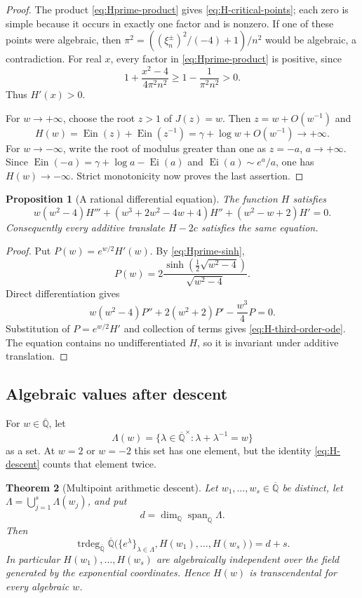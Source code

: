 \documentclass[11pt]{article}
\newtheorem{theorem}{Theorem}[section]
\newtheorem{proposition}[theorem]{Proposition}
\theoremstyle{definition}
\theoremstyle{remark}
\newcommand{\Q}{\mathbb Q}
\newcommand{\Qbar}{\overline{\mathbb Q}}
\newcommand{\Ein}{\operatorname{Ein}}
\newcommand{\Ei}{\operatorname{Ei}}
\newcommand{\Span}{\operatorname{span}}
\begin{document}
\begin{proof}
The product \eqref{eq:Hprime-product} gives
\eqref{eq:H-critical-points}; each zero is simple because it occurs in
exactly one factor and is nonzero.  If one of these points were algebraic,
then $\pi^2=((\xi_n^\pm)^2/(-4)+1)/n^2$ would be algebraic, a contradiction.
For real $x$, every factor in \eqref{eq:Hprime-product} is positive, since
\[
 1+\frac{x^2-4}{4\pi^2n^2}
 \geq1-\frac1{\pi^2n^2}>0.
\]
Thus $H'(x)>0$.

For $w\to+\infty$, choose the root $z>1$ of $J(z)=w$.  Then
$z=w+O(w^{-1})$ and
\[
 H(w)=\Ein(z)+\Ein(z^{-1})
     =\gamma+\log w+O(w^{-1})\longrightarrow+\infty.
\]
For $w\to-\infty$, write the root of modulus greater than one as $z=-a$,
$a\to+\infty$.  Since
$\Ein(-a)=\gamma+\log a-\Ei(a)$ and
$\Ei(a)\sim e^a/a$, one has $H(w)\to-\infty$.  Strict monotonicity now
proves the last assertion.
\end{proof}

\begin{proposition}[A rational differential equation]
\label{prop:H-ode}
The function $H$ satisfies
\begin{equation}\label{eq:H-third-order-ode}
 w(w^2-4)H'''
 +(w^3+2w^2-4w+4)H''
 +(w^2-w+2)H'=0.
\end{equation}
Consequently every additive translate $H-2c$ satisfies the same equation.
\end{proposition}

\begin{proof}
Put $P(w)=e^{w/2}H'(w)$.  By \eqref{eq:Hprime-sinh},
\[
 P(w)=2\frac{\sinh(\frac12\sqrt{w^2-4})}{\sqrt{w^2-4}}.
\]
Direct differentiation gives
\[
 w(w^2-4)P''+2(w^2+2)P'-\frac{w^3}{4}P=0.
\]
Substitution of $P=e^{w/2}H'$ and collection of terms gives
\eqref{eq:H-third-order-ode}.  The equation contains no undifferentiated
$H$, so it is invariant under additive translation.
\end{proof}

\subsection{Algebraic values after descent}

For $w\in\Qbar$, let
\[
 \Lambda(w)=\{\lambda\in\Qbar^\times:
                    \lambda+\lambda^{-1}=w\}
\]
as a set.  At $w=2$ or $w=-2$ this set has one element, but the identity
\eqref{eq:H-descent} counts that element twice.

\begin{theorem}[Multipoint arithmetic descent]
\label{thm:H-multipoint-descent}
Let $w_1,\ldots,w_s\in\Qbar$ be distinct, let
$\Lambda=\bigcup_{j=1}^s\Lambda(w_j)$, and put
\[
 d=\dim_{\Q}\Span_{\Q}\Lambda.
\]
Then
\begin{equation}\label{eq:H-multipoint-trdeg}
 \operatorname{trdeg}_{\Qbar}
 \Qbar\bigl(\{e^\lambda\}_{\lambda\in\Lambda},
             H(w_1),\ldots,H(w_s)\bigr)=d+s.
\end{equation}
In particular $H(w_1),\ldots,H(w_s)$ are algebraically independent over
the field generated by the exponential coordinates.  Hence $H(w)$ is
transcendental for every algebraic $w$.
\end{theorem}
\end{document}
